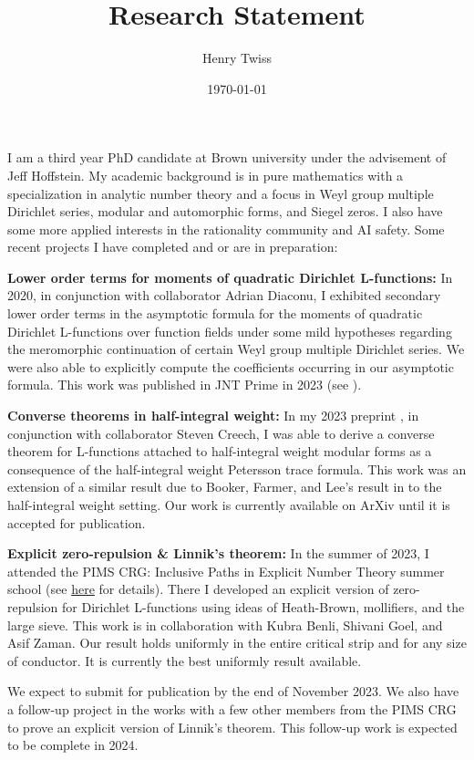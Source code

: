 \documentclass[12pt,reqno,oneside]{amsart}
\title{Research Statement}
\author{Henry Twiss}
\date{\today}
\begin{document}
\maketitle 
I am a third year PhD candidate at Brown university under the advisement of Jeff Hoffstein. My academic background is in pure mathematics with a specialization in analytic number theory and a focus in Weyl group multiple Dirichlet series, modular and automorphic forms, and Siegel zeros. I also have some more applied interests in the rationality community and AI safety. Some recent projects I have completed and or are in preparation:

\textbf{Lower order terms for moments of quadratic Dirichlet L-functions:} In 2020, in conjunction with collaborator Adrian Diaconu, I exhibited secondary lower order terms in the asymptotic formula for the moments of quadratic Dirichlet L-functions over function fields under some mild hypotheses regarding the meromorphic continuation of certain Weyl group multiple Dirichlet series. We were also able to explicitly compute the coefficients occurring in our asymptotic formula. This work was published in JNT Prime in 2023 (see \cite{DT}).

\textbf{Converse theorems in half-integral weight:}
In my 2023 preprint \cite{CT}, in conjunction with collaborator Steven Creech, I was able to derive a converse theorem for L-functions attached to half-integral weight modular forms as a consequence of the half-integral weight Petersson trace formula. This work was an extension of a similar result due to Booker, Farmer, and Lee's result in \cite{BFL} to the half-integral weight setting. Our work is currently available on ArXiv until it is accepted for publication.

\textbf{Explicit zero-repulsion \& Linnik’s theorem:}
In the summer of 2023, I attended the PIMS CRG: Inclusive Paths in Explicit Number Theory summer school (see \href{https://sites.google.com/view/crgl-functions/summer-school-inclusive-paths-in-explicit-number-theory}{here} for details). There I developed an explicit version of zero-repulsion for Dirichlet L-functions using ideas of Heath-Brown, mollifiers, and the large sieve. This work is in collaboration with Kubra Benli, Shivani Goel, and Asif Zaman. Our result holds uniformly in the entire critical strip and for any size of conductor. It is currently the best uniformly result available.

We expect to submit for publication by the end of November 2023. We also have a follow-up project in the works with a few other members from the PIMS CRG to prove an explicit version of Linnik’s theorem. This follow-up work is expected to be complete in 2024.
\end{document}
